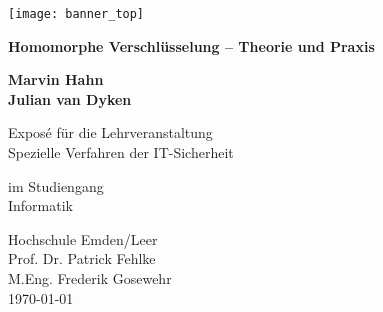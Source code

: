 
\begin{titlepage}
    
    \begin{flushright}
        \texttt{[image: banner\_top]}
    \end{flushright}

    \begin{flushleft}
        \vspace*{1cm}
        \Huge
        \textbf{Homomorphe Verschlüsselung – Theorie und Praxis}
        
        \vspace{1.5cm}
        \textbf{Marvin Hahn}\\
        \textbf{Julian van Dyken}
        
        \vspace{0.5cm}
        \Large
        Exposé für die Lehrveranstaltung\\
        Spezielle Verfahren der IT-Sicherheit
        
        \vspace{0.5cm}
        im Studiengang\\
        Informatik
        
    \end{flushleft}        

    \vspace{0.5cm}
    \begin{flushleft}
        Hochschule Emden/Leer\\
        Prof. Dr. Patrick Fehlke\\
        M.Eng. Frederik Gosewehr\\
        \today
    \end{flushleft}    

\end{titlepage}

\restoregeometry